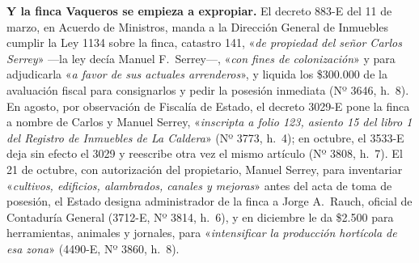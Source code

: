\textbf{Y la finca Vaqueros se empieza a expropiar.} El decreto 883-E del 11 de marzo, en Acuerdo
de Ministros, manda a la Dirección General de Inmuebles cumplir la Ley 1134 sobre la finca, catastro
141, «\textit{de propiedad del señor Carlos Serrey}» ---la ley decía Manuel F.\ Serrey---, «\textit{con
fines de colonización}» y para adjudicarla «\textit{a favor de sus actuales arrenderos}», y liquida
los \$300.000 de la avaluación fiscal para consignarlos y pedir la posesión inmediata (Nº 3646,
h.\ 8). En agosto, por observación de Fiscalía de Estado, el decreto 3029-E pone la finca a nombre
de Carlos y Manuel Serrey, «\textit{inscripta a folio 123, asiento 15 del libro 1 del Registro de
Inmuebles de La Caldera}» (Nº 3773, h.\ 4); en octubre, el 3533-E deja sin efecto el 3029 y reescribe
otra vez el mismo artículo (Nº 3808, h.\ 7). El 21 de octubre, con autorización del propietario,
Manuel Serrey, para inventariar «\textit{cultivos, edificios, alambrados, canales y mejoras}» antes
del acta de toma de posesión, el Estado designa administrador de la finca a Jorge A.\ Rauch, oficial
de Contaduría General (3712-E, Nº 3814, h.\ 6), y en diciembre le da \$2.500 para herramientas,
animales y jornales, para «\textit{intensificar la producción hortícola de esa zona}» (4490-E,
Nº 3860, h.\ 8).

